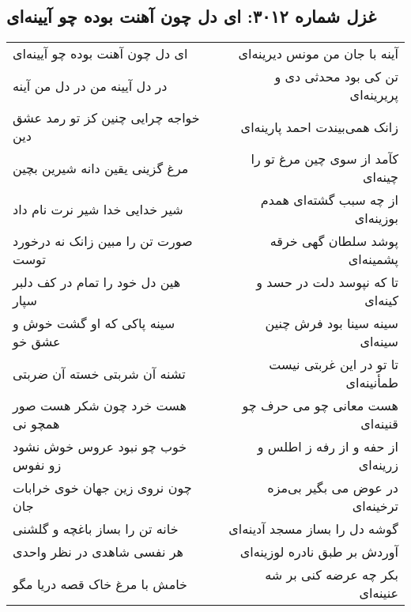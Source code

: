 \begin{center}
\section*{غزل شماره ۳۰۱۲: ای دل چون آهنت بوده چو آیینه‌ای}
\label{sec:3012}
\begin{longtable}{l p{0.5cm} r}
ای دل چون آهنت بوده چو آیینه‌ای
&&
آینه با جان من مونس دیرینه‌ای
\\
در دل آیینه من در دل من آینه
&&
تن کی بود محدثی دی و پریرینه‌ای
\\
خواجه چرایی چنین کز تو رمد عشق دین
&&
زانک همی‌بیندت احمد پارینه‌ای
\\
مرغ گزینی یقین دانه شیرین بچین
&&
کآمد از سوی چین مرغ تو را چینه‌ای
\\
شیر خدایی خدا شیر نرت نام داد
&&
از چه سبب گشته‌ای همدم بوزینه‌ای
\\
صورت تن را مبین زانک نه درخورد توست
&&
پوشد سلطان گهی خرقه پشمینه‌ای
\\
هین دل خود را تمام در کف دلبر سپار
&&
تا که نپوسد دلت در حسد و کینه‌ای
\\
سینه پاکی که او گشت خوش و عشق خو
&&
سینه سینا بود فرش چنین سینه‌ای
\\
تشنه آن شربتی خسته آن ضربتی
&&
تا تو در این غربتی نیست طمأنینه‌ای
\\
هست خرد چون شکر هست صور همچو نی
&&
هست معانی چو می حرف چو قنینه‌ای
\\
خوب چو نبود عروس خوش نشود زو نفوس
&&
از حفه و از رفه ز اطلس و زرینه‌ای
\\
چون نروی زین جهان خوی خرابات جان
&&
در عوض می بگیر بی‌مزه ترخینه‌ای
\\
خانه تن را بساز باغچه و گلشنی
&&
گوشه دل را بساز مسجد آدینه‌ای
\\
هر نفسی شاهدی در نظر واحدی
&&
آوردش بر طبق نادره لوزینه‌ای
\\
خامش با مرغ خاک قصه دریا مگو
&&
بکر چه عرضه کنی بر شه عنینه‌ای
\\
\end{longtable}
\end{center}
